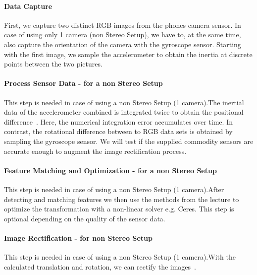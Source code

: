 \documentclass[a4paper,pagesize 10pt]{scrartcl}
\begin{document}

\paragraph{Data Capture}
First, we capture two distinct RGB images from the phones camera sensor. In case of using only 1 camera (non Stereo Setup), we have to, at the same time, also capture the orientation of the camera with the gyroscope sensor. Starting with the first image, we sample the accelerometer to obtain the inertia at discrete points between the two pictures.
\paragraph{Process Sensor Data - for a non Stereo Setup}
This step is needed in case of using a non Stereo Setup (1 camera).The inertial data of the accelerometer combined is integrated twice to obtain the positional difference~\cite{Seifert2007,Kok2017}. Here, the numerical integration error accumulates over time. In contrast, the rotational difference between to RGB data sets is obtained by sampling the gyroscope sensor. We will test if the supplied commodity sensors are accurate enough to augment the image rectification process.
\paragraph{Feature Matching and Optimization - for a non Stereo Setup}
This step is needed in case of using a non Stereo Setup (1 camera).After detecting and matching features we then use the methods from the lecture to optimize the transformation with a non-linear solver e.g. Ceres. This step is optional depending on the quality of the sensor data.
\paragraph{Image Rectification - for non Stereo Setup}
This step is needed in case of using a non Stereo Setup (1 camera).With the calculated translation and rotation, we can rectify the images~\cite{loop1999, Fusiello2000}. 
\end{document}

